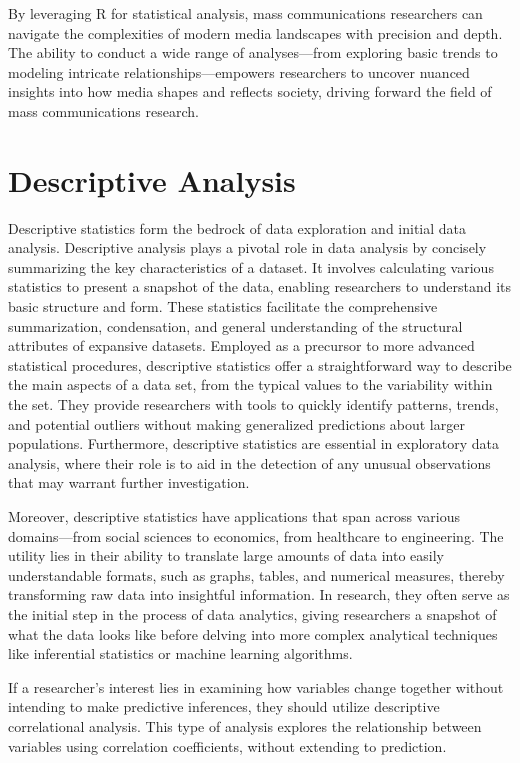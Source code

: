 \documentclass[
]{book}
\begin{document}
By leveraging R for statistical analysis, mass communications researchers can navigate the complexities of modern media landscapes with precision and depth. The ability to conduct a wide range of analyses---from exploring basic trends to modeling intricate relationships---empowers researchers to uncover nuanced insights into how media shapes and reflects society, driving forward the field of mass communications research.

\hypertarget{descriptive-analysis}{%
\section{Descriptive Analysis}\label{descriptive-analysis}}

Descriptive statistics form the bedrock of data exploration and initial data analysis. Descriptive analysis plays a pivotal role in data analysis by concisely summarizing the key characteristics of a dataset. It involves calculating various statistics to present a snapshot of the data, enabling researchers to understand its basic structure and form. These statistics facilitate the comprehensive summarization, condensation, and general understanding of the structural attributes of expansive datasets. Employed as a precursor to more advanced statistical procedures, descriptive statistics offer a straightforward way to describe the main aspects of a data set, from the typical values to the variability within the set. They provide researchers with tools to quickly identify patterns, trends, and potential outliers without making generalized predictions about larger populations. Furthermore, descriptive statistics are essential in exploratory data analysis, where their role is to aid in the detection of any unusual observations that may warrant further investigation.

Moreover, descriptive statistics have applications that span across various domains---from social sciences to economics, from healthcare to engineering. The utility lies in their ability to translate large amounts of data into easily understandable formats, such as graphs, tables, and numerical measures, thereby transforming raw data into insightful information. In research, they often serve as the initial step in the process of data analytics, giving researchers a snapshot of what the data looks like before delving into more complex analytical techniques like inferential statistics or machine learning algorithms.

If a researcher's interest lies in examining how variables change together without intending to make predictive inferences, they should utilize descriptive correlational analysis. This type of analysis explores the relationship between variables using correlation coefficients, without extending to prediction.
\end{document}
